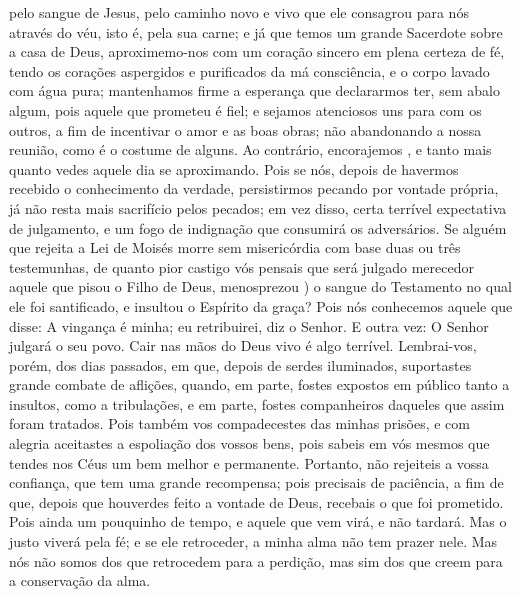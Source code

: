 {{} pelo sangue de Jesus,
  pelo caminho novo e vivo que ele consagrou para nós através do véu, isto é, pela sua carne;
  e já que temos um grande Sacerdote sobre a casa de Deus,
  aproximemo-nos com um coração sincero em plena certeza de fé, tendo os corações aspergidos e purificados da má consciência, e o corpo lavado com água pura;
  mantenhamos firme a esperança que declararmos ter, sem abalo algum, pois aquele que prometeu é fiel;
  e sejamos atenciosos uns para com os outros, a fim de incentivar o amor e as boas obras;
  não abandonando a nossa reunião, como é o costume de alguns. Ao contrário, encorajemos
{},  e tanto mais quanto vedes aquele dia
 se aproximando.
  Pois se nós, depois de havermos recebido o conhecimento da verdade, persistirmos pecando por vontade própria, já não resta mais sacrifício pelos pecados;
  em vez disso, certa terrível expectativa de julgamento, e um fogo de indignação
 que consumirá os adversários.
  Se alguém que rejeita a Lei de Moisés morre sem misericórdia com base
{} duas ou três testemunhas,
  de quanto pior castigo vós pensais que será julgado merecedor aquele que pisou o Filho de Deus, menosprezou
 ) o sangue do Testamento no qual ele foi santificado, e insultou o Espírito da graça?
  Pois nós conhecemos aquele que disse: A vingança é minha; eu retribuirei, diz o Senhor. E outra vez: O Senhor julgará o seu povo.
{}
  Cair nas mãos do Deus vivo é algo terrível.
  Lembrai-vos, porém, dos dias passados, em que, depois de serdes iluminados, suportastes grande combate de aflições,
  quando, em parte, fostes expostos em público tanto a insultos, como a tribulações, e em parte, fostes companheiros daqueles que assim foram tratados.
  Pois também vos compadecestes das minhas prisões, e com alegria aceitastes a espoliação dos vossos bens, pois sabeis em vós mesmos que tendes nos Céus um bem melhor e permanente.
  Portanto, não rejeiteis a vossa confiança, que tem uma grande recompensa;
  pois precisais de paciência, a fim de que, depois que houverdes feito a vontade de Deus, recebais o que foi prometido.
  Pois ainda um pouquinho de tempo, e aquele que vem virá, e não tardará.
{}
  Mas o justo viverá pela fé; e se ele retroceder, a minha alma não tem prazer nele.
{}
  Mas nós não somos dos que retrocedem para a perdição, mas sim dos que creem para a conservação da alma.
\par }

